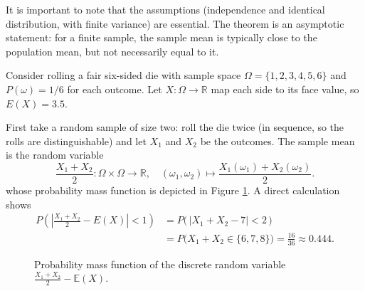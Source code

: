 It is important to note that the assumptions (independence and identical distribution, with finite variance) are essential. The theorem is an asymptotic statement: for a finite sample, the sample mean is typically close to the population mean, but not necessarily equal to it.

\begin{example}
Consider rolling a fair six-sided die with sample space $\Omega = \{1,2,3,4,5,6\}$ and $P(\omega)=1/6$ for each outcome. Let $X:\Omega \to \mathbb{R}$ map each side to its face value, so $E(X)=3.5$.

First take a random sample of size two: roll the die twice (in sequence, so the rolls are distinguishable) and let $X_1$ and $X_2$ be the outcomes. The sample mean is the random variable
\[
\frac{X_1 + X_2}{2} : \Omega \times \Omega \to \mathbb{R}, \quad
(\omega_1,\omega_2) \mapsto \frac{X_1(\omega_1) + X_2(\omega_2)}{2}.
\]
whose probability mass function is depicted in Figure \ref{fig:law_large_numbers_1}. A direct calculation shows
\begin{equation*}
\begin{split}
P\!\left(\left|\frac{X_1+X_2}{2} - E(X)\right| < 1\right) & = P\big(\,|X_1+X_2 - 7| < 2\,\big) \\
& = P\big(X_1+X_2 \in \{6,7,8\}\big) = \frac{16}{36} \approx 0.444.
\end{split}  
\end{equation*}

\begin{figure}[t]
\centering
{}
\caption{\label{fig:law_large_numbers_1}Probability mass function of the discrete random variable $\frac{X_1 + X_2 }{2} - \mathbb{E}(X)$.}
\end{figure}


\end{example}

